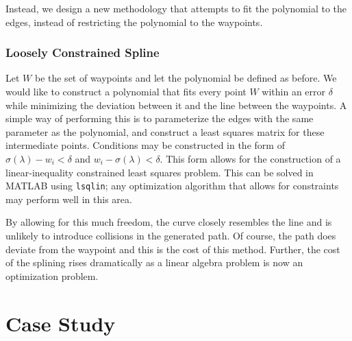\documentclass[oneside, 11pt]{book}
\begin{document}
Instead, we design a new methodology that attempts to fit the polynomial to the edges, instead of restricting the polynomial to the waypoints.

\subsection{Loosely Constrained Spline}\label{sec:restrictpolyfit}
Let $W$ be the set of waypoints and let the polynomial be defined as before. We would like to construct a polynomial that fits every point $W$ within an error $\delta$ while minimizing the deviation between it and the line between the waypoints. A simple way of performing this is to parameterize the edges with the same parameter as the polynomial, and construct a least squares matrix for these intermediate points. Conditions may be constructed in the form of $\sigma(\lambda) - w_i < \delta$ and $w_i - \sigma(\lambda) < \delta$. This form allows for the construction of a linear-inequality constrained least squares problem. This can be solved in MATLAB using \texttt{lsqlin}; any optimization algorithm that allows for constraints may perform well in this area.

By allowing for this much freedom, the curve closely resembles the line and is unlikely to introduce collisions in the generated path. Of course, the path does deviate from the waypoint and this is the cost of this method. Further, the cost of the splining rises dramatically as a linear algebra problem is now an optimization problem.

\chapter{Case Study}
\end{document}
